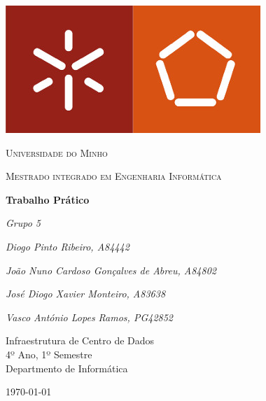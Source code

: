 \documentclass[12pt]{article}
\begin{document}
\thispagestyle{empty}
\setlength\headheight{0pt} 
\begin{center}

\begin{center}
\includegraphics[width=0.45\linewidth]{img/um_logo.jpg}            
\end{center}	

        \vspace{0.25cm}
        {\scshape\LARGE Universidade do Minho \par}
        \vspace{0.25cm}
        {\scshape\Large Mestrado integrado em Engenharia Informática\par}
        \vspace{0.5cm}

        {\Large\bfseries Trabalho Prático\par}
        
        
        \vspace{0.5cm}
        {\Large\itshape Grupo 5\par}
        {\Large\itshape Diogo Pinto Ribeiro, A84442\par}
        {\Large\itshape João Nuno Cardoso Gonçalves de Abreu, A84802\par}
        {\Large\itshape José Diogo Xavier Monteiro, A83638 \par}
        {\Large\itshape Vasco António Lopes Ramos, PG42852\par}
        \vspace{0.25cm}

\vspace{0.7cm}
Infraestrutura de Centro de Dados \\
4º Ano, 1º Semestre \\
Departmento de Informática\par
\vspace{0.7cm}
\large
\today

\end{center}

\clearpage
\restoregeometry
\justify

%
%
%
\end{document}
